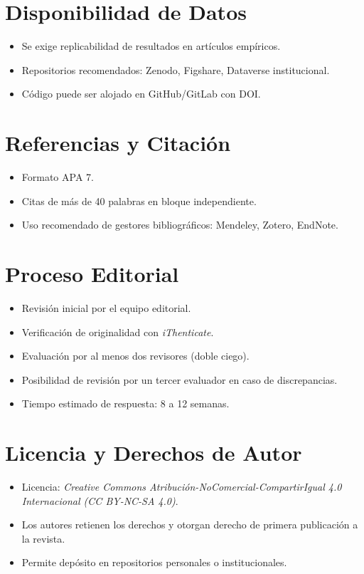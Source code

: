 \documentclass[12pt]{article}
\begin{document}
\section{Disponibilidad de Datos}
\begin{itemize}
  \item Se exige replicabilidad de resultados en artículos empíricos.
  \item Repositorios recomendados: Zenodo, Figshare, Dataverse institucional.
  \item Código puede ser alojado en GitHub/GitLab con DOI.
\end{itemize}

\section{Referencias y Citación}
\begin{itemize}
  \item Formato APA 7.
  \item Citas de más de 40 palabras en bloque independiente.
  \item Uso recomendado de gestores bibliográficos: Mendeley, Zotero, EndNote.
\end{itemize}

\section{Proceso Editorial}
\begin{itemize}
  \item Revisión inicial por el equipo editorial.
  \item Verificación de originalidad con \textit{iThenticate}.
  \item Evaluación por al menos dos revisores (doble ciego).
  \item Posibilidad de revisión por un tercer evaluador en caso de discrepancias.
  \item Tiempo estimado de respuesta: 8 a 12 semanas.
\end{itemize}

\section{Licencia y Derechos de Autor}
\begin{itemize}
  \item Licencia: \textit{Creative Commons Atribución-NoComercial-CompartirIgual 4.0 Internacional (CC BY-NC-SA 4.0)}.
  \item Los autores retienen los derechos y otorgan derecho de primera publicación a la revista.
  \item Permite depósito en repositorios personales o institucionales.
\end{itemize}
\end{document}
